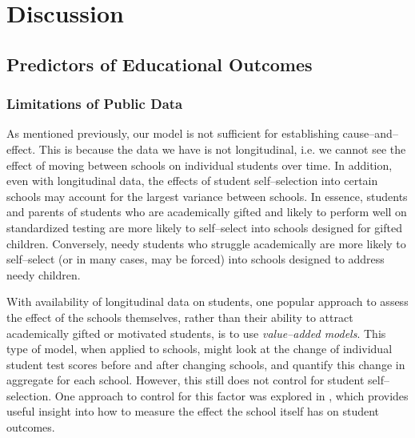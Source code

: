 \documentclass{article}
\begin{document}


\section{Discussion}
\subsection{Predictors of Educational Outcomes}\label{sec:model-discussion}
\subsubsection{Limitations of Public Data}
As mentioned previously, our model is not sufficient for establishing cause--and--effect. This is because the data we have is not longitudinal, i.e. we cannot see the effect of moving between schools on individual students over time. In addition, even with longitudinal data, the effects of student self--selection into certain schools may account for the largest variance between schools. In essence, students and parents of students who are academically gifted and likely to perform well on standardized testing are more likely to self--select into schools designed for gifted children. Conversely, needy students who struggle academically are more likely to self--select (or in many cases, may be forced) into schools designed to address needy children.

With availability of longitudinal data on students, one popular approach to assess the effect of the schools themselves, rather than their ability to attract academically gifted or motivated students, is to use \textit{value--added models}. This type of model, when applied to schools, might look at the change of individual student test scores before and after changing schools, and quantify this change in aggregate for each school. However, this still does not control for student self--selection. One approach to control for this factor was explored in \parencite{angrist}, which provides useful insight into how to measure the effect the school itself has on student outcomes.
\end{document}
